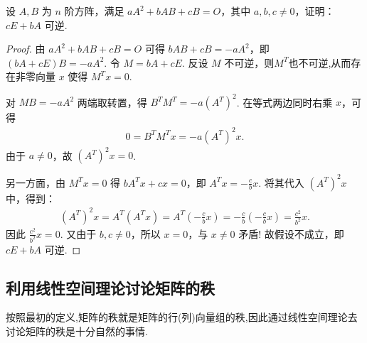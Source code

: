 \documentclass[../../main.tex]{subfiles}%
\begin{document}
\begin{example}
设 \(A,B\) 为 \(n\) 阶方阵，满足 \(aA^2+bAB+cB=O\)，其中 \(a,b,c\neq 0\)，证明：\(cE+bA\) 可逆.
\end{example}
\begin{proof}

由 \(aA^2+bAB+cB=O\) 可得 \(bAB+cB=-aA^2\)，即 \((bA+cE)B=-aA^2\). 
令 \(M=bA+cE\). 反设 \(M\) 不可逆，则$M^T$也不可逆,从而存在非零向量 \(x\) 使得 \(M^T x=0\).

对 \(MB=-aA^2\) 两端取转置，得 \(B^T M^T=-a(A^T)^2\). 在等式两边同时右乘 \(x\)，可得
\begin{align*}
0=B^T M^T x=-a(A^T)^2 x.
\end{align*}
由于 \(a\neq 0\)，故 \((A^T)^2 x=0\).

另一方面，由 \(M^T x=0\) 得 \(bA^T x+cx=0\)，即 \(A^T x=-\frac{c}{b}x\). 将其代入 \((A^T)^2 x\) 中，得到：
\begin{align*}
(A^T)^2 x=A^T(A^T x)=A^T\left(-\frac{c}{b}x\right)=-\frac{c}{b}\left(-\frac{c}{b}x\right)=\frac{c^2}{b^2}x.
\end{align*}
因此 \(\frac{c^2}{b^2}x=0\). 又由于 \(b,c\neq 0\)，所以 \(x=0\)，与 \(x\neq 0\) 矛盾!
故假设不成立，即 \(cE+bA\) 可逆.
\end{proof}


\subsection{利用线性空间理论讨论矩阵的秩}
按照最初的定义,矩阵的秩就是矩阵的行(列)向量组的秩,因此通过线性空间理论去讨论矩阵的秩是十分自然的事情.
\end{document}
